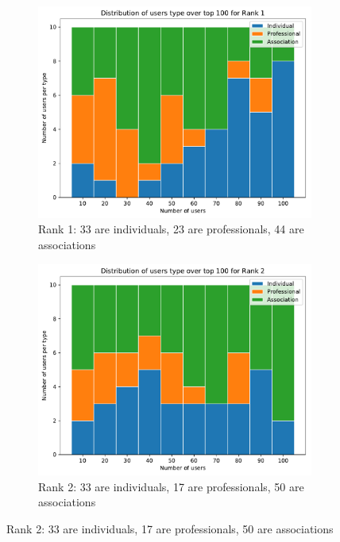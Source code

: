 \begin{figure}[htb]
	\centering
	\begin{subfigure}{.49\textwidth}
		\centering
		\includegraphics[width=\textwidth]{figures/rank1-distribution.pdf}
		\caption{Rank 1: 33 are individuals, 23 are professionals, 44 are associations}
		\label{fig:rank1-distribution}
	\end{subfigure}
	\hfill%
	\begin{subfigure}{.49\textwidth}
		\centering
		\includegraphics[width=1\textwidth]{figures/rank2-distribution.pdf}
		\caption{Rank 2: 33 are individuals, 17 are professionals, 50 are associations}
		\label{fig:rank2-distribution}
	\end{subfigure}

\end{figure}
